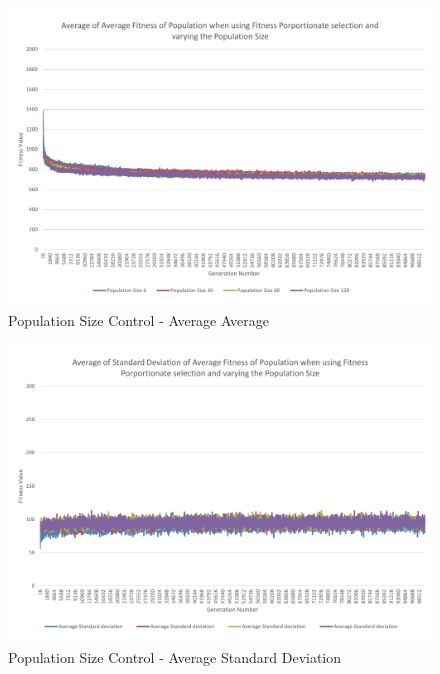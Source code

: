 \begin{landscape}
\begin{figure}[thbp]
	\centerline{\includegraphics[height=0.945\textwidth]{figures/CircleTests/PopulationSizeControl/CirclePopulationSizeControllAverageAverage.pdf}}
	\caption{Population Size Control - Average Average}
\end{figure}
\end{landscape}

\begin{landscape}
\begin{figure}[thbp]
	\centerline{\includegraphics[height=0.945\textwidth]{figures/CircleTests/PopulationSizeControl/CirclePopulationSizeControllAverageStandardDeviation.pdf}}
	\caption{Population Size Control - Average Standard Deviation}
\end{figure}
\end{landscape}

